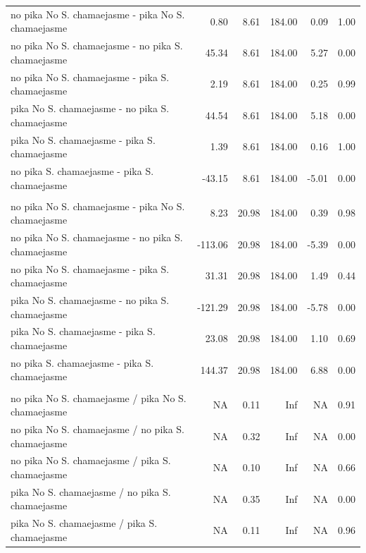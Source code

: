 \documentclass[
  letterpaper,
  DIV=11,
  numbers=noendperiod]{scrartcl}
\begin{document}
\begin{supptbl}
{\begin{table}
\begin{tabular*}{\linewidth}{@{\extracolsep{\fill}}lrrrrr}
\midrule\addlinespace[2.5pt]
\multicolumn{6}{l}{total grass bites} \\[2.5pt] 
\midrule\addlinespace[2.5pt]
no pika No S. chamaejasme - pika No S. chamaejasme & 0.80 & 8.61 & 184.00 & 0.09 & 1.00 \\ 
no pika No S. chamaejasme - no pika S. chamaejasme & 45.34 & 8.61 & 184.00 & 5.27 & 0.00 \\ 
no pika No S. chamaejasme - pika S. chamaejasme & 2.19 & 8.61 & 184.00 & 0.25 & 0.99 \\ 
pika No S. chamaejasme - no pika S. chamaejasme & 44.54 & 8.61 & 184.00 & 5.18 & 0.00 \\ 
pika No S. chamaejasme - pika S. chamaejasme & 1.39 & 8.61 & 184.00 & 0.16 & 1.00 \\ 
no pika S. chamaejasme - pika S. chamaejasme & -43.15 & 8.61 & 184.00 & -5.01 & 0.00 \\ 
\midrule\addlinespace[2.5pt]
\multicolumn{6}{l}{total steps} \\[2.5pt] 
\midrule\addlinespace[2.5pt]
no pika No S. chamaejasme - pika No S. chamaejasme & 8.23 & 20.98 & 184.00 & 0.39 & 0.98 \\ 
no pika No S. chamaejasme - no pika S. chamaejasme & -113.06 & 20.98 & 184.00 & -5.39 & 0.00 \\ 
no pika No S. chamaejasme - pika S. chamaejasme & 31.31 & 20.98 & 184.00 & 1.49 & 0.44 \\ 
pika No S. chamaejasme - no pika S. chamaejasme & -121.29 & 20.98 & 184.00 & -5.78 & 0.00 \\ 
pika No S. chamaejasme - pika S. chamaejasme & 23.08 & 20.98 & 184.00 & 1.10 & 0.69 \\ 
no pika S. chamaejasme - pika S. chamaejasme & 144.37 & 20.98 & 184.00 & 6.88 & 0.00 \\ 
\midrule\addlinespace[2.5pt]
\multicolumn{6}{l}{sedges bite steps} \\[2.5pt] 
\midrule\addlinespace[2.5pt]
no pika No S. chamaejasme / pika No S. chamaejasme & NA & 0.11 & Inf & NA & 0.91 \\ 
no pika No S. chamaejasme / no pika S. chamaejasme & NA & 0.32 & Inf & NA & 0.00 \\ 
no pika No S. chamaejasme / pika S. chamaejasme & NA & 0.10 & Inf & NA & 0.66 \\ 
pika No S. chamaejasme / no pika S. chamaejasme & NA & 0.35 & Inf & NA & 0.00 \\ 
pika No S. chamaejasme / pika S. chamaejasme & NA & 0.11 & Inf & NA & 0.96 \\ 

\end{tabular*}
\end{table}}
\end{supptbl}
\end{document}
